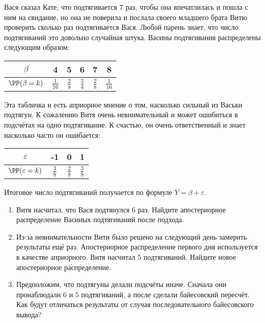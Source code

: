 \begin{problem}
Вася сказал Кате, что подтягивается $7$ раз, чтобы она впечатлилась и пошла с ним на свидание, но она не поверила и послала своего младшего брата Витю проверить сколько раз подтягивается Вася. Любой парень знает, что число подтягиваний это довольно случайная штука. Васины подтягивания распределены следующим образом: 

\begin{center}
	\begin{tabular}{c|c|c|c|c|c}
		$\beta$ & 4 & 5 & 6 & 7 & 8 \\ \hline
		$\PP(\beta = k)$ & $\frac{1}{16}$ & $\frac{2}{8}$ &  $\frac{3}{4}$ &  $\frac{2}{8}$ &  $\frac{1}{16}$ \\ 
	\end{tabular}
\end{center}

Эта табличка и есть априорное мнение о том, насколько сильный из Васьки подтягун. К сожалению Витя очень невнимательный и может ошибиться в подсчётах на одно подтягивание. К счастью, он очень ответственный и знает насколько часто он ошибается: 

\begin{center}
	\begin{tabular}{c|c|c|c}
		$\varepsilon$ & -1 & 0 & 1 \\ \hline
		$\PP(\varepsilon = k)$ & $\frac{3}{8}$ & $\frac{2}{8}$ &  $\frac{3}{8}$  \\ 
	\end{tabular}
\end{center}

Итоговое число подтягиваний получается по формуле  $Y = \beta + \varepsilon$.

\begin{enumerate}
	\item Витя насчитал, что Вася подтянулся $6$ раз.  Найдите апостериорное распределение Васиных подтягиваний после подхода. 
	
	\item Из-за невнимательности Вити было решено на следующий день замерить результаты ещё раз.  Апостериорное распределение первого дня используется в качестве априорного. Витя насчитал $5$ подтягиваний. Найдите новое апостериорное распределение. 
	
	\item Предположим, что подтягуны делали подсчёты иначе. Сначала они пронаблюдали $6$ и $5$ подтягиваний, а после сделали байесовский пересчёт. Как будут отличаться результаты от случая последовательного байесовского вывода? 
	

\end{enumerate}
\end{problem}
